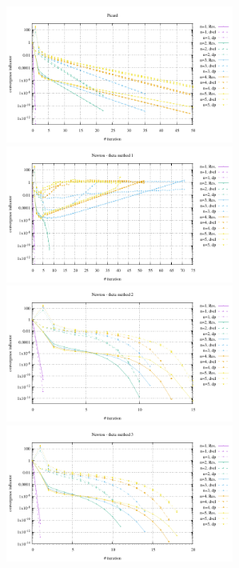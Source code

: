 \begin{center}
\includegraphics[width=7.5cm]{python_codes/fieldstone_87/results/experiment_11/conv_picard.pdf}
\includegraphics[width=7.5cm]{python_codes/fieldstone_87/results/experiment_11/conv_meth1.pdf}\\
\includegraphics[width=7.5cm]{python_codes/fieldstone_87/results/experiment_11/conv_meth2.pdf}
\includegraphics[width=7.5cm]{python_codes/fieldstone_87/results/experiment_11/conv_meth3.pdf}
\end{center}

